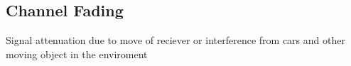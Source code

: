 
\subsection{Channel Fading}
Signal attenuation due to move of reciever or interference from cars and other moving object in the enviroment
